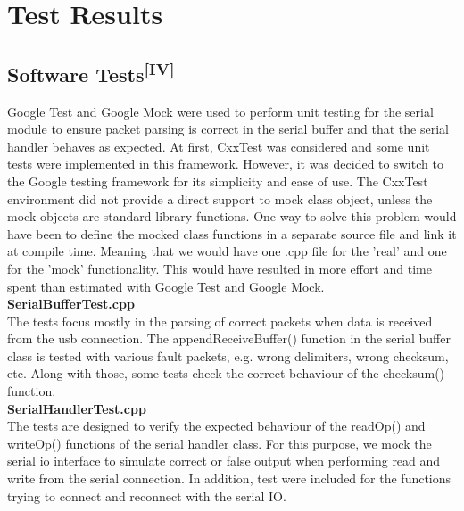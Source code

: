 \chapter{Test Results}
\section[Software Tests]{Software Tests\textsuperscript{[IV]}}
Google Test and Google Mock were used to perform unit testing for the serial
module to ensure packet parsing is correct in the serial buffer and that the
serial handler behaves as expected. At first, CxxTest was considered and some
unit tests were implemented in this framework. However, it was decided to switch
to the Google testing framework for its simplicity and ease of use. The CxxTest
environment did not provide a direct support to mock class object, unless the
mock objects are standard library functions. One way to solve this problem would
have been to define the mocked class functions in a separate source file and
link it at compile time. Meaning that we would have one .cpp file for the 'real'
and one for the 'mock' functionality. This would have resulted in more effort
and time spent than estimated with Google Test and Google Mock.\\

\noindent
\textbf{SerialBufferTest.cpp}\\
The tests focus mostly in the parsing of correct packets when data is received
from the usb connection. The appendReceiveBuffer() function in the serial buffer
class is tested with various fault packets, e.g. wrong delimiters, wrong
checksum, etc. Along with those, some tests check the correct behaviour of the
checksum() function.\\

\noindent
\textbf{SerialHandlerTest.cpp}\\
The tests are designed to verify the expected behaviour of the readOp() and
writeOp() functions of the serial handler class. For this purpose, we mock the
serial io interface to simulate correct or false output when performing read and
write from the serial connection. In addition, test were included for the
functions trying to connect and reconnect with the serial IO.

